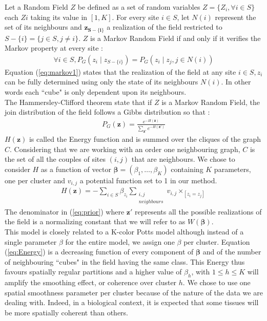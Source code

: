 Let a Random Field $Z$ be defined as a set of random variables $Z = \{Z_i , \forall i \in S\}$ each $Zi$ taking its value in $[1,K]$. For every site $i \in S$, let $N(i)$ represent the set of its neighbours and $\mathbf{z_{S-\{i\}}}$ a realization of the field restricted to $S-\{i\} = \{j \in S, j \neq i\}$. $Z$ is a Markov Random Field if and only if it verifies the Markov property at every site :
\begin{align}
\label{eq:markov1}
\forall i \in S, P_G (z_i \mid z_{S-\{i\}}) = P_G (z_i \mid z_j , j \in N(i))
\end{align}
Equation (\ref{eq:markov1}) states that the realization of the field at any site $i \in S, z_i$ can be fully determined using only the state of its neighbours $N(i)$. In other words each ``cube" is only dependent upon its neighbours.\\
The Hammersley-Clifford theorem state that if $Z$ is a Markov Random Field, the join distribution of the field follows a Gibbs distribution so that :
\begin{align}
\label{eq:prior}
P_G (\mathbf{z}) = \frac{e^{-H(\mathbf{z})}}{\sum\limits_{\mathbf{z'}} e^{-H(\mathbf{z'})}}
\end{align}
$H(\mathbf{z})$ is called the Energy function and is summed over the cliques of the graph $C$. Considering that we are working with an order one neighbouring graph, $C$ is the set of all the couples of sites $(i,j)$ that are neighbours. We chose to consider $H$ as a function of vector $\mathbf{\beta} = (\beta_1, \hdots, \beta_K)$ containing $K$ parameters, one per cluster and $v_{i,j}$ a potential function set to 1 in our method. 
\begin{align}
\label{eq:Energy}
H(\mathbf{z}) = - \sum\limits_{i \in S}\beta_{z_i}\sum_{\substack{i,j\\neighbours}}  v_{i,j} \times _{[z_i = z_j]}
\end{align}
The denominator in (\ref{eq:prior}) where $\mathbf{z'}$ represents all the possible realizations of the field is a normalizing constant that we will refer to as $W(\mathbf{\beta})$.\\
This model is closely related to a K-color Potts model \cite{Wu82} although instead of a single parameter $\beta$ for the entire model, we assign one $\beta$ per cluster. Equation (\ref{eq:Energy}) is a decreasing function of every component of $\mathbf{\beta}$ and of the number of neighbouring ``cubes" in the field having the same class. This Energy thus favours spatially regular partitions and a higher value of $\beta_h$, with $1 \leq h \leq K $ will amplify the smoothing effect, or coherence over cluster $h$. We chose to use one spatial smoothness parameter per cluster because of the nature of the data we are dealing with. Indeed, in a biological context, it is expected that some tissues will be more spatially coherent than others.\\

